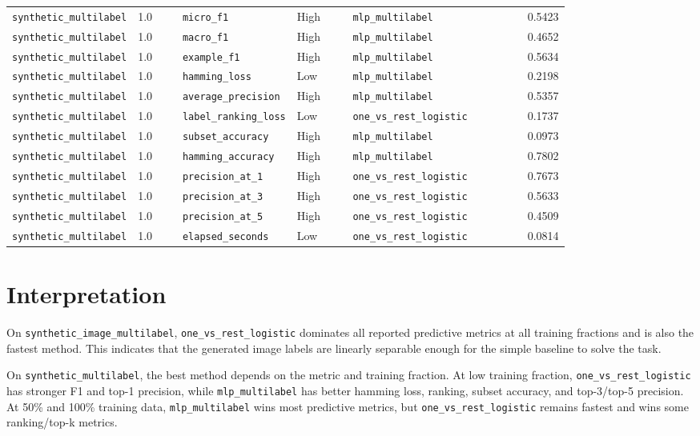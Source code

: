 \documentclass[11pt]{article}
\begin{document}
\begin{longtable}{p{0.18\linewidth} p{0.08\linewidth} p{0.20\linewidth} p{0.10\linewidth} p{0.25\linewidth} r}
\texttt{synthetic\_multilabel} & 1.0 & \texttt{micro\_f1} & High & \texttt{mlp\_multilabel} & 0.5423 \\
\texttt{synthetic\_multilabel} & 1.0 & \texttt{macro\_f1} & High & \texttt{mlp\_multilabel} & 0.4652 \\
\texttt{synthetic\_multilabel} & 1.0 & \texttt{example\_f1} & High & \texttt{mlp\_multilabel} & 0.5634 \\
\texttt{synthetic\_multilabel} & 1.0 & \texttt{hamming\_loss} & Low & \texttt{mlp\_multilabel} & 0.2198 \\
\texttt{synthetic\_multilabel} & 1.0 & \texttt{average\_precision} & High & \texttt{mlp\_multilabel} & 0.5357 \\
\texttt{synthetic\_multilabel} & 1.0 & \texttt{label\_ranking\_loss} & Low & \texttt{one\_vs\_rest\_logistic} & 0.1737 \\
\texttt{synthetic\_multilabel} & 1.0 & \texttt{subset\_accuracy} & High & \texttt{mlp\_multilabel} & 0.0973 \\
\texttt{synthetic\_multilabel} & 1.0 & \texttt{hamming\_accuracy} & High & \texttt{mlp\_multilabel} & 0.7802 \\
\texttt{synthetic\_multilabel} & 1.0 & \texttt{precision\_at\_1} & High & \texttt{one\_vs\_rest\_logistic} & 0.7673 \\
\texttt{synthetic\_multilabel} & 1.0 & \texttt{precision\_at\_3} & High & \texttt{one\_vs\_rest\_logistic} & 0.5633 \\
\texttt{synthetic\_multilabel} & 1.0 & \texttt{precision\_at\_5} & High & \texttt{one\_vs\_rest\_logistic} & 0.4509 \\
\texttt{synthetic\_multilabel} & 1.0 & \texttt{elapsed\_seconds} & Low & \texttt{one\_vs\_rest\_logistic} & 0.0814 \\

\bottomrule
\end{longtable}

\section{Interpretation}

On \texttt{synthetic\_image\_multilabel}, \texttt{one\_vs\_rest\_logistic}
dominates all reported predictive metrics at all training fractions and is also
the fastest method. This indicates that the generated image labels are linearly
separable enough for the simple baseline to solve the task.

On \texttt{synthetic\_multilabel}, the best method depends on the metric and
training fraction. At low training fraction, \texttt{one\_vs\_rest\_logistic}
has stronger F1 and top-1 precision, while \texttt{mlp\_multilabel} has better
hamming loss, ranking, subset accuracy, and top-3/top-5 precision. At 50\% and
100\% training data, \texttt{mlp\_multilabel} wins most predictive metrics, but
\texttt{one\_vs\_rest\_logistic} remains fastest and wins some ranking/top-k
metrics.
\end{document}
